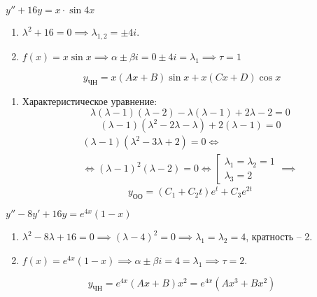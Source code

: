 \begin{example}
    $y'' + 16y = x\cdot \sin 4x$
    \begin{enumerate}
        \item $\lambda^2 + 16 = 0 \implies \lambda_{1,2} = \pm 4i$.
        \item $f(x) = x\sin x \implies \alpha \pm \beta i = 0 \pm 4i = \lambda_1 \implies \tau = 1$
    \end{enumerate}
    \[
        y_{\text{ЧН}} = x(Ax + B)\sin x + x(Cx + D)\cos x
    \]
    \begin{enumerate}
        \item Характеристическое уравнение:
              \[
                  \lambda(\lambda - 1)(\lambda-2)-\lambda(\lambda-1)+2\lambda - 2 =0
              \]
              \[
                  (\lambda-1)(\lambda^2-2\lambda-\lambda)+2(\lambda-1) = 0
              \]
              \begin{multline*}
                  (\lambda - 1)(\lambda^2 - 3\lambda + 2)= 0\iff \\
                  \iff (\lambda-1)^2(\lambda-2) = 0 \iff \left[\begin{array}{l}
                      \lambda_1 = \lambda_2 = 1 \\
                      \lambda_3 = 2
                  \end{array}\right. \implies
              \end{multline*}
              \[
                  y_{\text{ОО}} = (C_1 + C_2t)e^t + C_3e^{2t}
              \]
    \end{enumerate}
\end{example}

\begin{example}
    $y'' - 8y' + 16y = e^{4x}(1-x)$
    \begin{enumerate}
        \item $\lambda^2 - 8\lambda + 16 = 0 \implies (\lambda-4)^2 = 0 \implies \lambda_1 = \lambda_2 = 4$, кратность -- 2.
        \item $f(x)= e^{4x}(1-x)\implies \alpha \pm \beta i = 4 = \lambda_1 \implies \tau = 2$.
    \end{enumerate}
    \[
        y_{\text{ЧН}} = e^{4x}(Ax + B)x^2 = e^{4x}(Ax^3 + Bx^2)
    \]
\end{example}